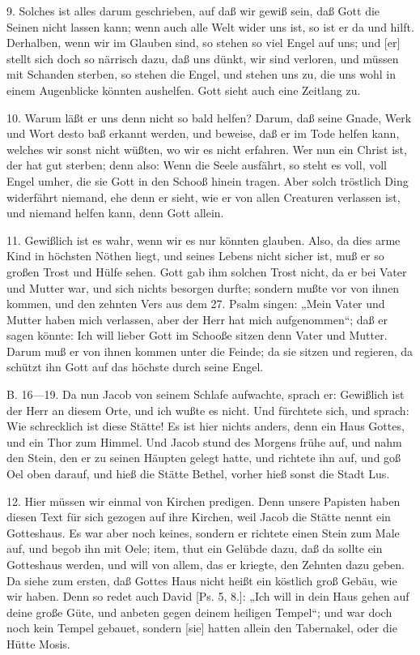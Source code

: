 9. Solches ist alles darum geschrieben, auf daß wir gewiß sein, daß Gott die Seinen nicht lassen kann; wenn auch alle Welt wider uns ist,
so ist er da und hilft. Derhalben, wenn wir im Glauben sind, so stehen so viel Engel auf uns; und [er] stellt sich doch so närrisch dazu, daß uns dünkt, wir sind verloren, und müssen mit Schanden sterben, so stehen die Engel, und stehen uns zu, die uns wohl in einem Augenblicke könnten aushelfen. Gott sieht auch eine Zeitlang zu.

10. Warum läßt er uns denn nicht so bald helfen? Darum, daß seine Gnade, Werk und Wort desto baß erkannt werden, und beweise, daß er im Tode helfen kann, welches wir sonst nicht wüßten, wo wir es nicht erfahren. Wer nun ein Christ ist, der hat gut sterben; denn also: Wenn die Seele ausfährt, so steht es voll, voll Engel umher, die sie Gott in den Schooß hinein tragen. Aber solch tröstlich Ding widerfährt niemand, ehe denn er sieht, wie er von allen Creaturen verlassen ist, und niemand helfen kann, denn Gott allein.

11. Gewißlich ist es wahr, wenn wir es nur könnten glauben. Also, da dies arme Kind in höchsten Nöthen liegt, und seines Lebens nicht sicher ist, muß er so großen Trost und Hülfe sehen. Gott gab ihm solchen Trost nicht, da er bei Vater und Mutter war, und sich nichts besorgen durfte; sondern mußte vor von ihnen kommen, und den zehnten Vers aus dem 27. Psalm singen: „Mein Vater und Mutter haben mich verlassen, aber der Herr hat mich aufgenommen“; daß er sagen könnte: Ich will lieber Gott im Schooße sitzen denn Vater und Mutter. Darum muß er von ihnen kommen unter die Feinde; da sie sitzen und regieren, da schützt ihn Gott auf das höchste durch seine Engel.

B. 16—19. Da nun Jacob von seinem Schlafe aufwachte, sprach er: Gewißlich ist der Herr an diesem Orte, und ich wußte es nicht. Und fürchtete sich, und sprach: Wie schrecklich ist diese Stätte! Es ist hier nichts anders, denn ein Haus Gottes, und ein Thor zum Himmel. Und Jacob stund des Morgens frühe auf, und nahm den Stein, den er zu seinen Häupten gelegt hatte, und richtete ihn auf, und goß Oel oben darauf, und hieß die Stätte Bethel, vorher hieß sonst die Stadt Lus.

12. Hier müssen wir einmal von Kirchen predigen. Denn unsere Papisten haben diesen Text für sich gezogen auf ihre Kirchen, weil Jacob die Stätte nennt ein Gotteshaus. Es war aber noch keines, sondern er richtete einen Stein zum Male auf, und begob ihn mit Oele; item, thut ein Gelübde dazu, daß da sollte ein Gotteshaus werden, und will von allem, das er kriegte, den Zehnten dazu geben. Da siehe zum ersten, daß Gottes Haus nicht heißt ein köstlich groß Gebäu, wie wir haben. Denn so redet auch David [Ps. 5, 8.]: „Ich will in dein Haus gehen auf deine große Güte, und anbeten gegen deinem heiligen Tempel“; und war doch noch kein Tempel gebauet, sondern [sie] hatten allein den Tabernakel, oder die Hütte Mosis.

